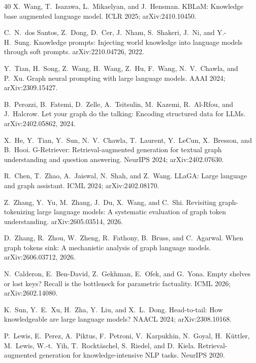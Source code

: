 \documentclass{article}
\begin{document}
\begin{thebibliography}{40}
 X.~Wang, T.~Isazawa, L.~Mikaelyan, and J.~Hensman.
\newblock KBLaM: Knowledge base augmented language model.
\newblock ICLR 2025; arXiv:2410.10450.

 C.~N.~dos Santos, Z.~Dong, D.~Cer, J.~Nham, S.~Shakeri, J.~Ni, and
  Y.-H.~Sung.
\newblock Knowledge prompts: Injecting world knowledge into language models through soft
  prompts.
\newblock arXiv:2210.04726, 2022.

 Y.~Tian, H.~Song, Z.~Wang, H.~Wang, Z.~Hu, F.~Wang, N.~V.~Chawla, and P.~Xu.
\newblock Graph neural prompting with large language models.
\newblock AAAI 2024; arXiv:2309.15427.

 B.~Perozzi, B.~Fatemi, D.~Zelle, A.~Tsitsulin, M.~Kazemi, R.~Al-Rfou, and
  J.~Halcrow.
\newblock Let your graph do the talking: Encoding structured data for LLMs.
\newblock arXiv:2402.05862, 2024.

 X.~He, Y.~Tian, Y.~Sun, N.~V.~Chawla, T.~Laurent, Y.~LeCun, X.~Bresson,
  and B.~Hooi.
\newblock G-Retriever: Retrieval-augmented generation for textual graph understanding and
  question answering.
\newblock NeurIPS 2024; arXiv:2402.07630.

 R.~Chen, T.~Zhao, A.~Jaiswal, N.~Shah, and Z.~Wang.
\newblock LLaGA: Large language and graph assistant.
\newblock ICML 2024; arXiv:2402.08170.

 Z.~Zhang, Y.~Yu, M.~Zhang, J.~Du, X.~Wang, and C.~Shi.
\newblock Revisiting graph-tokenizing large language models: A systematic evaluation of graph
  token understanding.
\newblock arXiv:2605.03514, 2026.

 D.~Zhang, R.~Zhou, W.~Zheng, R.~Fathony, B.~Bruss, and C.~Agarwal.
\newblock When graph tokens sink: A mechanistic analysis of graph language models.
\newblock arXiv:2606.03712, 2026.

 N.~Calderon, E.~Ben-David, Z.~Gekhman, E.~Ofek, and G.~Yona.
\newblock Empty shelves or lost keys? Recall is the bottleneck for parametric factuality.
\newblock ICML 2026; arXiv:2602.14080.

 K.~Sun, Y.~E.~Xu, H.~Zha, Y.~Liu, and X.~L.~Dong.
\newblock Head-to-tail: How knowledgeable are large language models?
\newblock NAACL 2024; arXiv:2308.10168.

 P.~Lewis, E.~Perez, A.~Piktus, F.~Petroni, V.~Karpukhin, N.~Goyal,
  H.~K\"{u}ttler, M.~Lewis, W.-t.~Yih, T.~Rockt\"{a}schel, S.~Riedel, and D.~Kiela.
\newblock Retrieval-augmented generation for knowledge-intensive NLP tasks.
\newblock NeurIPS 2020.


\end{thebibliography}
\end{document}
